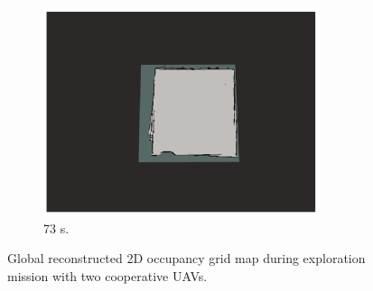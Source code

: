 \documentclass[11pt,openany]{book}
\begin{document}
\begin{figure}[H]
\begin{subfigure}[H]{0.3\linewidth}
        \includegraphics[width=\linewidth]{assets/4_12_i.png}
        \caption{{73 s.}}
        \label{fig:4.12i}
    \end{subfigure}
    \caption{{Global reconstructed 2D occupancy grid map during exploration mission with two cooperative UAVs.}}
    \label{fig:4.12}
\end{figure}
\end{document}
